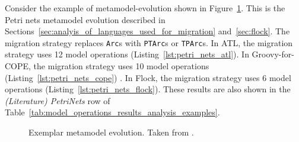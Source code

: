 Consider the example of metamodel-evolution shown in Figure~\ref{fig:quantitive_petri_nets_mms}. This is the Petri nets metamodel evolution described in Sections~\ref{sec:analyis_of_languages_used_for_migration} and~\ref{sec:flock}. The migration strategy replaces \texttt{Arc}s with \texttt{PTArc}s or \texttt{TPArc}s. In ATL, the migration strategy uses 12 model operations (Listing~\ref{lst:petri_nets_atl}). In Groovy-for-COPE, the migration strategy uses 10 model operations (Listing~\ref{lst:petri_nets_cope}) . In Flock, the migration strategy uses 6 model operations (Listing~\ref{lst:petri_nets_flock}). These results are also shown in the \emph{(Literature) PetriNets} row of Table~\ref{tab:model_operations_results_analysis_examples}.

\begin{figure}[tbp]
	\centering
	\caption[Exemplar metamodel evolution (Petri nets)]{Exemplar metamodel evolution. Taken from \cite{rose10flock}.}
\label{fig:quantitive_petri_nets_mms}
\end{figure}

